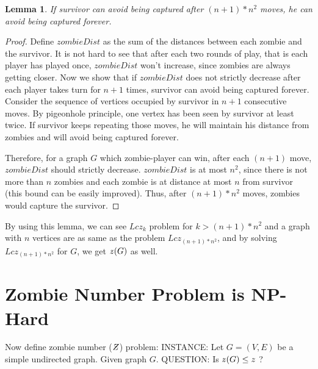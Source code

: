 \documentclass[1p]{elsarticle}
\newtheorem{lemma}[theorem]{Lemma}
\newcommand{\NPZ}{\ooalign{$Z$\cr\hfil\rule[.8ex]{.3em}{.09ex}\hfil\cr}}
\newcommand{\zn}{\ooalign{$z$\cr\hfil\rule[.5ex]{.2em}{.08ex}\hfil\cr}}
\begin{document}
	\begin{lemma}
		\label{limit-moves}
		If survivor can avoid being captured after $(n + 1) * n^2$ moves, he can avoid being captured forever.
	\end{lemma}
	\begin{proof}
		Define $zombieDist$ as the sum of the distances between each zombie and the survivor. It is not hard to see that
		after each two rounds of play, that is each player has played once, $zombieDist$ won't increase, since zombies
		are always getting closer. Now we show that if $zombieDist$ does not strictly decrease after each player takes
		turn for $n + 1$ times, survivor can avoid being captured forever. Consider the sequence of vertices occupied by
		survivor in $n + 1$ consecutive moves. By pigeonhole principle, one vertex has been seen by survivor at least
		twice. If survivor keeps repeating those moves, he will maintain his distance from zombies and will avoid being
		captured forever.

		Therefore, for a graph $G$ which zombie-player can win, after each $(n + 1)$ move, $zombieDist$ should strictly
		decrease. $zombieDist$ is at most $n^2$, since there is not more than $n$ zombies and each zombie is at distance
		at most $n$ from survivor (this bound can be easily improved). Thus, after $(n + 1) * n^2$ moves, zombies would
		capture the survivor.
	\end{proof}

	By using this lemma, we can see $Lcz_k$ problem for $k > (n + 1) * n^2$ and a graph with $n$ vertices are as same as
	the problem $Lcz_{(n + 1) * n^2}$, and by solving $Lcz_{(n + 1) * n^2}$ for $G$, we get $\zn(G)$ as well.


	
	\section{Zombie Number Problem is NP-Hard}\label{np-zombienumber}

	Now define zombie number ($\NPZ$) problem:
	{\newline}
	INSTANCE: Let $G = (V,E)$ be a simple undirected graph. Given graph $G$.
	{\newline}
	QUESTION: Is $\zn (G) \leq z$ ?
\end{document}
